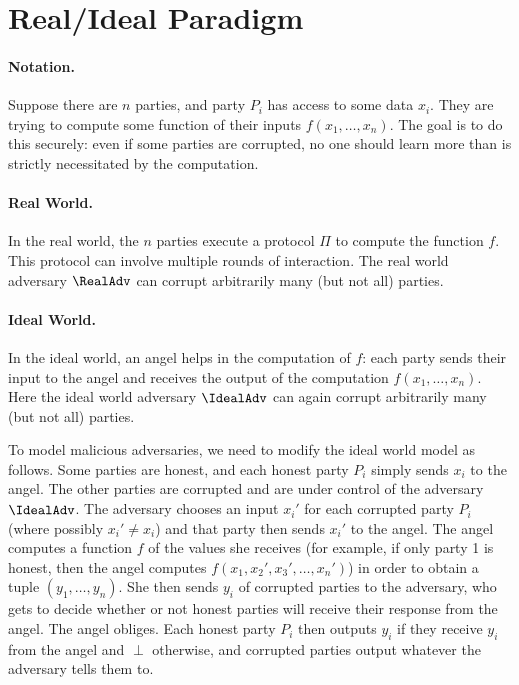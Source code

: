 \section{Real/Ideal Paradigm}
\paragraph{Notation.} 
Suppose there are $n$ parties, and party $P_i$ has access to some data $x_i$. They are trying to compute some function of their inputs $f(x_1, \dotsc, x_n)$. The goal is to do this securely: even if some parties are corrupted, no one should learn more than is strictly necessitated by the computation.

\paragraph{Real World.} In the real world, the $n$ parties execute a protocol $\Pi$
to compute the function $f$. This protocol can involve multiple rounds of
interaction. %
The real world adversary $\RealAdv$ can corrupt arbitrarily many (but not all) parties.


\paragraph{Ideal World.} In the ideal world, an angel helps in the
computation of $f$:
each party sends their input to the angel and receives the output of the computation $f(x_1, \dotsc, x_n)$.
Here the ideal world adversary $\IdealAdv$ can again corrupt arbitrarily many (but not all) parties.

To model malicious adversaries, we need to modify the ideal world model as follows. 
Some parties are honest, and each honest party $P_i$ simply sends $x_i$ to the angel. The other parties are corrupted and are under control of the adversary $\IdealAdv$. The adversary chooses an input $x_i'$ for each corrupted party $P_i$ (where possibly $x_i' \neq x_i$) and that party then sends $x_i'$ to the angel. The angel computes a function $f$ of the values she receives (for example, if only party 1 is honest, then the angel computes $f(x_1, x_2', x_3', \dotsc, x_n')$) in order to obtain a tuple $(y_1, \dotsc, y_n)$. 
She then sends $y_i$ of corrupted parties to the adversary, who gets to decide whether or not honest parties will receive their response from the angel. The angel obliges. Each honest party $P_i$ then outputs $y_i$ if they receive $y_i$ from the angel and $\perp$ otherwise, and corrupted parties output whatever the adversary tells them to. 

